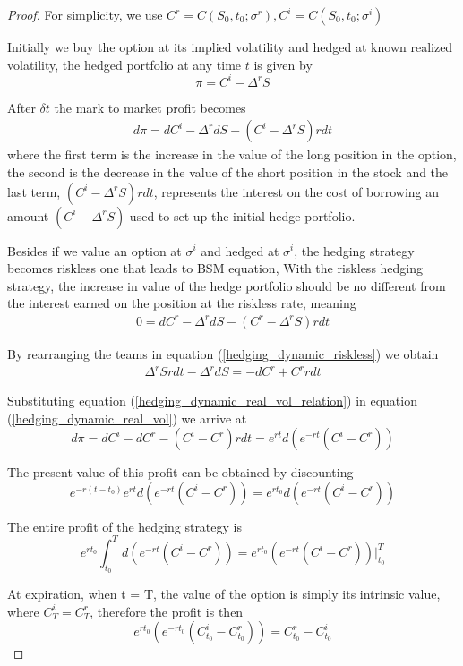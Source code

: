 \documentclass[10pt]{article}
\theoremstyle{plain}
\numberwithin{equation}{section}
\numberwithin{table}{section}
\newcommand{\s}{\sigma}
\newcommand{\prt}[1]{\left( #1 \right)}  %
\newcommand{\de}{\delta}
\begin{document}
\begin{proof}
    For simplicity, we use $C^r = C(S_0,t_0;\s^r), C^i = C(S_0,t_0;\s^i)$

    Initially we buy the option at its implied volatility and hedged at known realized volatility, the hedged portfolio
    at any time $t$ is given by
    \[
        \pi = C^i - \Delta^r S    
    \]

    After $\de t$ the mark to market profit becomes
    \begin{eqnarray}
        d\pi = dC^i - \Delta^r dS - (C^i -\Delta^r S)rdt  
        \label{hedging_dynamic_real_vol}     
    \end{eqnarray}
    where the first term is the increase in the value of the long position in the option, the
    second is the decrease in the value of the short position in the stock and the last term, $(C^i -\Delta^r S)rdt$, represents the interest on the cost
    of borrowing an amount $(C^i -\Delta^r S)$ used to set up the initial hedge portfolio.

    Besides if we value an option at $\s^i$ and hedged at $\s^i$, the hedging strategy becomes riskless one that leads to BSM equation, With the riskless
    hedging strategy, the increase in value of the hedge portfolio should be no different from the interest earned on the position at the riskless rate, meaning 
    \begin{eqnarray}
        0 = dC^r - \Delta^r dS - (C^r -\Delta^r S)rdt 
        \label{hedging_dynamic_riskless}
    \end{eqnarray}
    
    By rearranging the teams in equation (\ref{hedging_dynamic_riskless}) we obtain 
    \begin{eqnarray}
        \Delta^r S rdt  - \Delta^r dS = - dC^r + C^r rdt    
        \label{hedging_dynamic_real_vol_relation}
    \end{eqnarray} 
    
    Substituting equation (\ref{hedging_dynamic_real_vol_relation}) in equation (\ref{hedging_dynamic_real_vol}) we arrive at
    \[
        d\pi = dC^i - dC^r - (C^i -C^r)rdt   = e^{rt} d\prt{e^{-rt}(C^i - C^r)}    
    \]

    The present value of this profit can be obtained by discounting
    \[
        e^{-r(t-t_0)}e^{rt} d\prt{e^{-rt}(C^i - C^r)}  = e^{rt_0} d\prt{e^{-rt}(C^i - C^r)} 
    \] 

    The entire profit of the hedging strategy is 
    \[
        e^{rt_0} \int_{t_0}^T d\prt{e^{-rt}(C^i - C^r)} = e^{rt_0} \prt{e^{-rt}(C^i - C^r)} \left. \right|_{t_0}^T
    \]

    At expiration, when t = T, the value of the option is simply its intrinsic value, where $C^i_T=C^r_T$, therefore the profit is then 
    \[
        e^{rt_0}\prt{e^{-rt_0} (C^i_{t_0} - C^r_{t_0})} = C^r_{t_0} - C^i_{t_0}  
    \] 

\end{proof}
\end{document}

